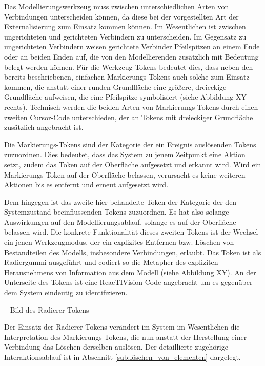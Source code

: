 Das Modellierungswerkzeug muss zwischen unterschiedlichen Arten von Verbindungen unterscheiden können, da diese bei der vorgestellten Art der Externalisierung zum Einsatz kommen können. Im Wesentlichen ist zwischen ungerichteten und gerichteten Verbindern zu unterscheiden. Im Gegensatz zu ungerichteten Verbindern weisen gerichtete Verbinder Pfeilspitzen an einem Ende oder an beiden Enden auf, die von den Modellierenden zusätzlich mit Bedeutung belegt werden können. Für die Werkzeug-Tokens bedeutet dies, dass neben den bereits beschriebenen, einfachen Markierungs-Tokens auch solche zum Einsatz kommen, die anstatt einer runden Grundfläche eine größere, dreieckige Grundfläche aufweisen, die eine Pfeilspitze symbolisiert (siehe Abbildung XY rechts). Technisch werden die beiden Arten von Markierungs-Tokens durch einen zweiten Cursor-Code unterschieden, der an Tokens mit dreieckiger Grundfläche zusätzlich angebracht ist.

Die Markierungs-Tokens sind der Kategorie der ein Ereignis auslösenden Tokens zuzuordnen. Dies bedeutet, dass das System zu jenem Zeitpunkt eine Aktion setzt, zudem das Token auf der Oberfläche aufgesetzt und erkannt wird. Wird ein Markierungs-Token auf der Oberfläche belassen, verursacht es keine weiteren Aktionen bis es entfernt und erneut aufgesetzt wird.

Dem hingegen ist das zweite hier behandelte Token der Kategorie der den Systemzustand beeinflussenden Tokens zuzuordnen. Es hat also solange Auswirkungen auf den Modellierungsablauf, solange es auf der Oberfläche belassen wird. Die konkrete Funktionalität dieses zweiten Tokens ist der Wechsel ein jenen Werkzeugmodus, der ein explizites Entfernen bzw. Löschen von Bestandteilen des Modells, insbesondere Verbindungen, erlaubt. Das Token ist als Radiergummi ausgeführt und codiert so die Metapher des expliziten Herausnehmens von Information aus dem Modell (siehe Abbildung XY). An der Unterseite des Tokens ist eine ReacTIVision-Code angebracht um es gegenüber dem System eindeutig zu identifizieren.

-- Bild des Radierer-Tokens --

Der Einsatz der Radierer-Tokens verändert im System im Wesentlichen die Interpretation des Markierungs-Tokens, die nun anstatt der Herstellung einer Verbindung das Löschen derselben auslösen. Der detaillierte zugehörige Interaktionsablauf ist in Abschnitt \ref{sub:löschen_von_elementen} dargelegt.

